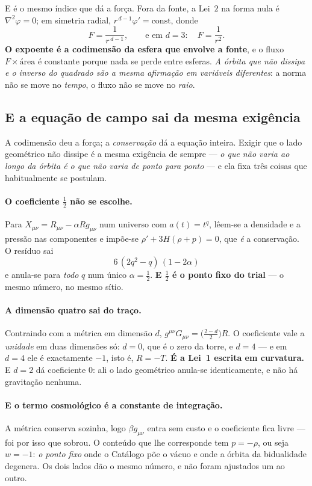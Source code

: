 \documentclass[livro.tex]{subfiles}
\begin{document}
\noindent E é o mesmo índice que dá a força. Fora da fonte, a Lei~$2$ na forma nula é
$\nabla^{2}\varphi=0$; em simetria radial, $r^{\,d-1}\varphi'=\text{const}$, donde
\[
  F = \frac{1}{r^{\,d-1}}, \qquad\text{e em } d=3: \quad F=\frac{1}{r^{2}} .
\]
\textbf{O expoente é a codimensão da esfera que envolve a fonte}, e o fluxo $F\times\text{área}$ é
constante porque nada se perde entre esferas. \emph{A órbita que não dissipa e o inverso do quadrado
são a mesma afirmação em variáveis diferentes}: a norma não se move no \emph{tempo}, o fluxo não se
move no \emph{raio}.

\subsection{E a equação de campo sai da mesma exigência}\label{sec:campo}

A codimensão deu a força; a \emph{conservação} dá a equação inteira. Exigir que o lado geométrico
não dissipe é a mesma exigência de sempre --- \emph{o que não varia ao longo da órbita é o que não
varia de ponto para ponto} --- e ela fixa três coisas que habitualmente se postulam.

\paragraph{O coeficiente $\tfrac12$ não se escolhe.} Para $X_{\mu\nu}=R_{\mu\nu}-\alpha R
g_{\mu\nu}$ num universo com $a(t)=t^{q}$, lêem-se a densidade e a pressão nas componentes e
impõe-se $\rho'+3H(\rho+p)=0$, que \emph{é} a conservação. O resíduo sai
\[
  \boxed{\;6\,(2q^{2}-q)\,(1-2\alpha)\;}
\]
e anula-se para \emph{todo} $q$ num único $\alpha=\tfrac12$. \textbf{E $\tfrac12$ é o ponto fixo do
trial} --- o mesmo número, no mesmo sítio.

\paragraph{A dimensão quatro sai do traço.} Contraindo com a métrica em dimensão $d$,
$g^{\mu\nu}G_{\mu\nu}=\bigl(\tfrac{2-d}{2}\bigr)R$. O coeficiente vale a \emph{unidade} em duas
dimensões só: $d=0$, que é o zero da torre, e $d=4$ --- e em $d=4$ ele é exactamente $-1$, isto é,
$R=-T$. \textbf{É a Lei~1 escrita em curvatura.} E $d=2$ dá coeficiente $0$: ali o lado geométrico
anula-se identicamente, e não há gravitação nenhuma.

\paragraph{E o termo cosmológico é a constante de integração.} A métrica conserva sozinha, logo
$\beta g_{\mu\nu}$ entra sem custo e o coeficiente fica livre --- foi por isso que sobrou. O
conteúdo que lhe corresponde tem $p=-\rho$, ou seja $w=-1$: \emph{o ponto fixo} onde o Catálogo põe
o vácuo e onde a órbita da bidualidade degenera. Os dois lados dão o mesmo número, e não foram
ajustados um ao outro.
\end{document}
